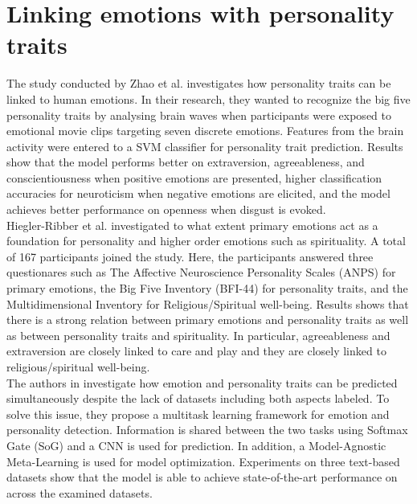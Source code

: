 \section{Linking emotions with personality traits}
\label{sec:emotion-personality-link}
The study conducted by Zhao et al. \cite{Zhao2018} investigates how personality traits can be linked to human emotions. In their research, they wanted to recognize the big five personality traits by analysing brain waves when participants were exposed to emotional movie clips targeting seven discrete emotions. Features from the brain activity were entered to a SVM classifier for personality trait prediction. Results show that the model performs better on extraversion, agreeableness, and conscientiousness when positive emotions are presented, higher classification accuracies for neuroticism when negative emotions are elicited, and the model achieves better performance on openness when disgust is evoked. \\

Hiegler-Ribber et al. \cite{personality_emotions_link} investigated to what extent primary emotions act as a foundation for personality and higher order emotions such as spirituality. A total of 167 participants joined the study. Here, the participants answered three questionares such as The Affective Neuroscience Personality Scales (ANPS) for primary emotions, the Big Five Inventory (BFI-44) for personality traits, and the Multidimensional Inventory for Religious/Spiritual well-being. Results shows that there is a strong relation between primary emotions and personality traits as well as between personality traits and spirituality. In particular, agreeableness and extraversion are closely linked to care and play and they are closely linked to religious/spiritual well-being. \\ 

The authors in \cite{personality-emotion1-LI2022340} investigate how emotion and personality traits can be predicted simultaneously despite the lack of datasets including both aspects labeled. To solve this issue, they propose a multitask learning framework for emotion and personality detection. Information is shared between the two tasks using Softmax Gate (SoG) and a CNN is used for prediction. In addition, a Model-Agnostic Meta-Learning is used for model optimization. Experiments on three text-based datasets show that the model is able to achieve state-of-the-art performance on across the examined datasets. \\

